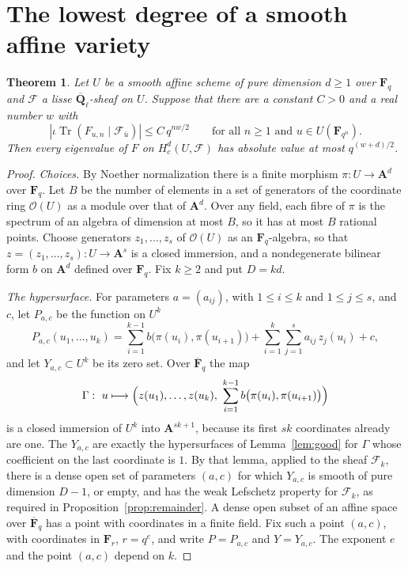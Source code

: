 \documentclass[11pt,a4paper]{article}
\theoremstyle{plain}
\newtheorem{theorem}{Theorem}
\theoremstyle{remark}
\newcommand{\Fq}{\mathbf F_q}
\newcommand{\Fqb}{\overline{\mathbf F}_q}
\newcommand{\Ql}{\overline{\mathbf Q}_\ell}
\newcommand{\A}{\mathbf A}
\newcommand{\F}{\mathcal F}
\newcommand{\Tr}{\operatorname{Tr}}
\begin{document}
\section{The lowest degree of a smooth affine variety}\label{sec:middle}

\begin{theorem}\label{thm:middle}
Let $U$ be a smooth affine scheme of pure dimension $d\ge1$ over $\Fq$ and $\F$ a lisse $\Ql$-sheaf on $U$. Suppose
that there are a constant $C>0$ and a real number $w$ with
\[
|\iota\Tr(F_{u,n}\mid\F_{\bar u})|\le C\,q^{nw/2}\qquad\text{for all }n\ge1\text{ and }u\in U(\mathbf F_{q^n}).
\]
Then every eigenvalue of $F$ on $H^d_c(U,\F)$ has absolute value at most $q^{(w+d)/2}$.
\end{theorem}

\begin{proof}
\emph{Choices.} By Noether normalization \cite[Tag 00OY]{Stacks} there is a finite morphism $\pi:U\to\A^d$ over
$\Fq$. Let $B$ be the number of elements in a set of generators of the coordinate ring $\mathcal O(U)$ as a module
over that of $\A^d$. Over any field, each fibre of $\pi$ is the spectrum of an algebra of dimension at most $B$, so
it has at most $B$ rational points. Choose generators $z_1,\dots,z_s$ of $\mathcal O(U)$ as an $\Fq$-algebra, so that
$z=(z_1,\dots,z_s):U\to\A^s$ is a closed immersion, and a nondegenerate bilinear form $b$ on $\A^d$ defined over
$\Fq$. Fix $k\ge2$ and put $D=kd$.

\emph{The hypersurface.} For parameters $a=(a_{ij})$, with $1\le i\le k$ and $1\le j\le s$, and $c$, let $P_{a,c}$
be the function on $U^k$
\[
P_{a,c}(u_1,\dots,u_k)=\sum_{i=1}^{k-1}b\bigl(\pi(u_i),\pi(u_{i+1})\bigr)+\sum_{i=1}^k\sum_{j=1}^sa_{ij}\,z_j(u_i)+c,
\]
and let $Y_{a,c}\subset U^k$ be its zero set. Over $\Fqb$ the map
\[
\Gamma:\ u\longmapsto\Bigl(z(u_1),\dots,z(u_k),\ \sum_{i=1}^{k-1}b\bigl(\pi(u_i),\pi(u_{i+1})\bigr)\Bigr)
\]
is a closed immersion of $U^k$ into $\A^{sk+1}$, because its first $sk$ coordinates already are one. The $Y_{a,c}$
are exactly the hypersurfaces of Lemma~\ref{lem:good} for $\Gamma$ whose coefficient on the last coordinate is $1$.
By that lemma, applied to the sheaf $\F_k$, there is a dense open set of parameters $(a,c)$ for which $Y_{a,c}$
is smooth of pure dimension $D-1$, or empty, and has the weak Lefschetz property for $\F_k$, as required in
Proposition~\ref{prop:remainder}. A dense open subset of an affine space over $\Fqb$ has a point with coordinates in
a finite field. Fix such a point $(a,c)$, with coordinates in $\mathbf F_r$, $r=q^e$, and write $P=P_{a,c}$ and
$Y=Y_{a,c}$. The exponent $e$ and the point $(a,c)$ depend on $k$.


\end{proof}
\end{document}
